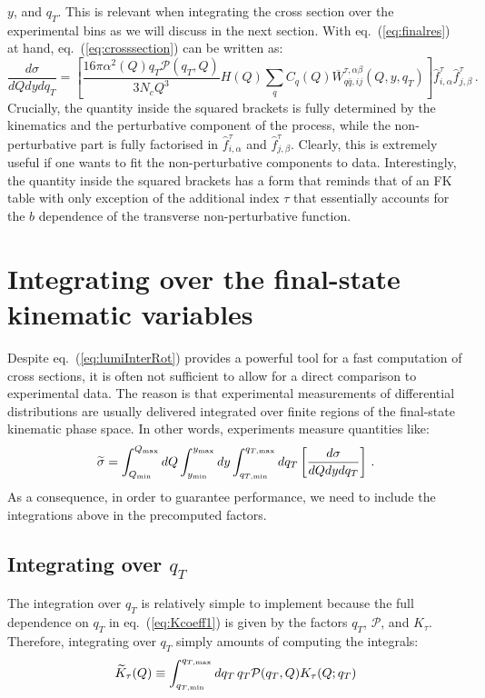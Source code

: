 \documentclass[10pt,a4paper]{article}
\begin{document}
$y$, and $q_T$. This is relevant when integrating the cross section
over the experimental bins as we will discuss in the next
section. With eq.~(\ref{eq:finalres}) at hand,
eq.~(\ref{eq:crosssection}) can be written as:
\begin{equation}
  \frac{d\sigma}{dQ dy dq_T} =\left[
    \frac{16\pi\alpha^2(Q)q_T\mathcal{P}(q_T,Q)}{3N_c Q^3} H(Q) \sum_q C_q(Q)
    \overline{W}_{q\bar{q},ij}^{\tau,\alpha\beta}(Q,y,q_T)\right]\hat{f}_{i,\alpha}^{\tau}
  \hat{f}_{j,\beta}^{\tau}\,.
\end{equation}
Crucially, the quantity inside the squared brackets is fully
determined by the kinematics and the perturbative component of the
process, while the non-perturbative part is fully factorised in
$\hat{f}_{i,\alpha}^{\tau}$ and $\hat{f}_{j,\beta}^{\tau}$. Clearly,
this is extremely useful if one wants to fit the non-perturbative
components to data. Interestingly, the quantity inside the squared
brackets has a form that reminds that of an FK table with only
exception of the additional index $\tau$ that essentially accounts for
the $b$ dependence of the transverse non-perturbative function.

\section{Integrating over the final-state kinematic variables}

Despite eq.~(\ref{eq:lumiInterRot}) provides a powerful tool for a
fast computation of cross sections, it is often not sufficient to
allow for a direct comparison to experimental data. The reason is that
experimental measurements of differential distributions are usually
delivered integrated over finite regions of the final-state kinematic
phase space. In other words, experiments measure quantities like:
\begin{equation}\label{eq:Intcrosssection}
\widetilde{\sigma}=\int_{Q_{\rm min}}^{Q_{\rm max}}dQ \int_{y_{\rm min}}^{y_{\rm max}}dy \int_{q_{T,\rm min}}^{q_{T,\rm max}}dq_T\left[\frac{d\sigma}{dQ dy dq_T} \right]\,.
\end{equation}
As a consequence, in order to guarantee performance, we need to
include the integrations above in the precomputed factors.

\subsection{Integrating over $q_T$}

The integration over $q_T$ is relatively simple to implement because
the full dependence on $q_T$ in eq.~(\ref{eq:Kcoeff1}) is given by the
factors $q_T$, $\mathcal{P}$, and $K_\tau$. Therefore, integrating
over $q_T$ simply amounts of computing the integrals:
\begin{equation}\label{eq:KcoeffInt}
  \widetilde{K}_\tau(Q)\equiv \int_{q_{T,\rm min}}^{q_{T,\rm max}}dq_T\,q_T\mathcal{P}(q_T,Q) K_\tau(Q;q_T)
\end{equation}
\end{document}
